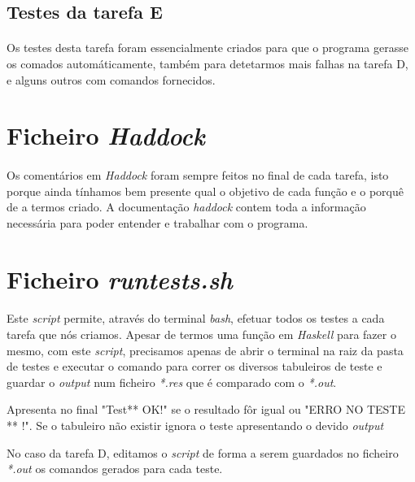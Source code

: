 \documentclass[a4paper,12pt]{article}
\begin{document}
\subsection{Testes da tarefa E}

\paragraph{}
Os testes desta tarefa foram essencialmente criados para que o programa gerasse os comados automáticamente, também para detetarmos mais falhas na tarefa D, e alguns outros com comandos fornecidos.


\section{Ficheiro \emph{Haddock}}

\paragraph{}
Os comentários em \emph{Haddock} foram sempre feitos no final de cada tarefa, isto porque ainda tínhamos bem presente qual o objetivo de cada função e o porquê de a termos criado. A documentação \emph{haddock} contem toda a informação necessária para poder entender e trabalhar com o programa.

\section{Ficheiro \emph{runtests.sh}}

\paragraph{}
Este \emph{script} permite, através do terminal \emph{bash}, efetuar todos os testes a cada tarefa que nós criamos. Apesar de termos uma função em \emph{Haskell} para fazer o mesmo, com este \emph{script}, precisamos apenas de abrir o terminal na raiz da pasta de testes e executar o comando para correr os diversos tabuleiros de teste e guardar o \emph{output} num ficheiro \emph{*.res} que é comparado com o \emph{*.out}.

Apresenta no final "Test** OK!" se o resultado fôr igual ou "ERRO NO TESTE ** !". Se o tabuleiro não existir ignora o teste apresentando o devido \emph{output}

No caso da tarefa D, editamos o \emph{script} de forma a serem guardados no ficheiro \emph{*.out} os comandos gerados para cada teste.
\end{document}
